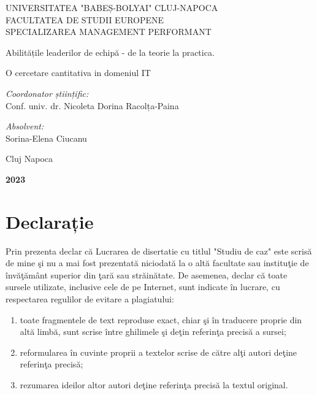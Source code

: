 \documentclass[a4paper, 12pt]{article}
\begin{document}
\begin{titlepage}
	\begin{center}
		\vspace{0.5cm}
		\large {UNIVERSITATEA "BABEȘ-BOLYAI" CLUJ-NAPOCA}
		\\
		\large {FACULTATEA DE STUDII EUROPENE}
		\\\large {SPECIALIZAREA MANAGEMENT PERFORMANT}
		
		\vspace{2.75cm}
		
	
		\huge Abilitățile leaderilor de echipă - de la teorie la practica. 
		
		\huge O cercetare cantitativa  in domeniul IT
		\vspace{1.5 cm}
		
		\vfill
	\end{center}
	
	\begin{flushleft}
		\large{\textit{Coordonator științific:}} \\
		\large{Conf. univ. dr. Nicoleta Dorina Racolța-Paina}
	\end{flushleft}
	
	\begin{flushright}
		\hfill \large {\textit{Absolvent:}} \\
		\hfill \large {Sorina-Elena Ciucanu}
	\end{flushright}
	
	\begin{center}
		\vspace{1.5cm}
		\Large{Cluj Napoca}
		
		\large \textbf{2023}
	\end{center}
\end{titlepage}
\restoregeometry
\thispagestyle{empty}
\section*{Declarație}
\bigskip
\qquad Prin prezenta declar că Lucrarea de disertatie cu titlul "Studiu de caz" este scrisă de mine şi nu a mai fost prezentată niciodată la o altă facultate sau instituţie de învăţământ superior din ţară sau străinătate. De asemenea, declar că toate sursele utilizate, inclusive cele de pe Internet, sunt indicate în lucrare, cu respectarea regulilor de evitare a plagiatului:
	\begin{enumerate}[-]
	\item toate fragmentele de text reproduse exact, chiar şi în traducere proprie din altă limbă, sunt scrise între ghilimele şi deţin referinţa precisă a sursei;
	\item reformularea în cuvinte proprii a textelor scrise de către alţi autori deţine referinţa precisă;
	\item rezumarea ideilor altor autori deţine referinţa precisă la textul original.
	\end{enumerate}
\end{document}
